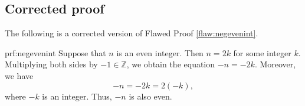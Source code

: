 \clearpage
\subsection{Corrected proof}

The following is a corrected version of Flawed Proof \ref{flaw:negevenint}. 

\begin{prf}{prf:negevenint} 
Suppose that $n$ is an even integer. Then $n=2k$ for some integer $k$. Multiplying both sides by $-1 \in \mathbb{Z}$, we obtain the equation $-n=-2k$. Moreover, we have
\[-n = -2k = 2(-k),\]
where $-k$ is an integer.  Thus, $-n$ is also even. 
\end{prf}
